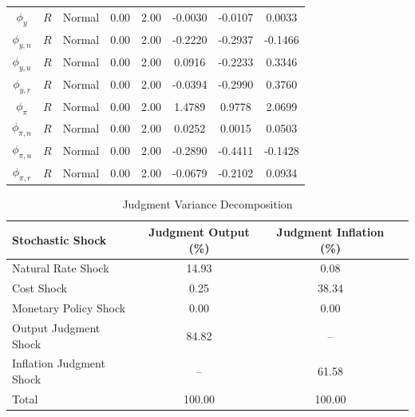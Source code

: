 \documentclass[12pt]{article}
\begin{document}
{\begin{table}
\begin{center}
\begin{tabular}{c|c||c|cc||c|cc}
$\phi_{y}$ & ${R}$ & Normal & 0.00 & 2.00 & -0.0030 & -0.0107 & 0.0033 \\ 
$\phi_{y,n}$ & ${R}$ & Normal & 0.00 & 2.00 & -0.2220 & -0.2937 & -0.1466 \\ 
$\phi_{y,u}$ & ${R}$ & Normal & 0.00 & 2.00 & 0.0916 & -0.2233 & 0.3346 \\ 
$\phi_{y,r}$ & ${R}$ & Normal & 0.00 & 2.00 & -0.0394 & -0.2990 & 0.3760 \\ 
$\phi_{\pi}$ & ${R}$ & Normal & 0.00 & 2.00 & 1.4789 & 0.9778 & 2.0699 \\ 
$\phi_{\pi,n}$ & ${R}$ & Normal & 0.00 & 2.00 & 0.0252 & 0.0015 & 0.0503 \\ 
$\phi_{\pi,u}$ & ${R}$ & Normal & 0.00 & 2.00 & -0.2890 & -0.4411 & -0.1428 \\ 
$\phi_{\pi,r}$ & ${R}$ & Normal & 0.00 & 2.00 & -0.0679 & -0.2102 & 0.0934 \\ \hline
\end{tabular}
\end{center}
\end{table}


\begin{table}\caption{Judgment Variance Decomposition}\label{tb:newsdec}
\begin{center}
\vspace*{1pc}
\begin{tabular}{l|c|cc} \hline
Stochastic Shock & Judgment Output (\%) & Judgment Inflation (\%) \\ \hline
Natural Rate Shock & 14.93 & 0.08  \\
Cost Shock & 0.25 & 38.34  \\
Monetary Policy Shock & 0.00 & 0.00 \\
Output Judgment Shock & 84.82 & -- \\
Inflation Judgment Shock & -- & 61.58 \\ \hline
Total & 100.00 & 100.00 \\ \hline
\end{tabular}
\end{center}
\end{table}

}
\end{document}
